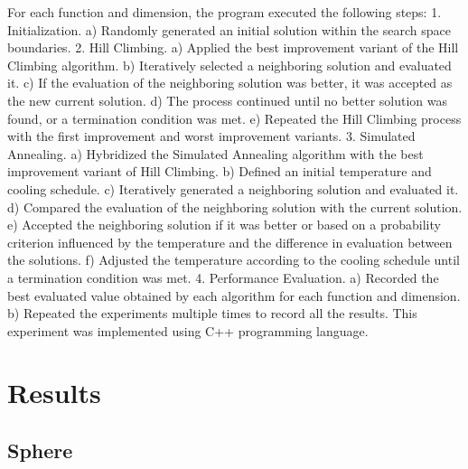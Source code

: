 \documentclass{article}
\begin{document}
For each function and dimension, the program executed the following steps:
1. Initialization.
a) Randomly generated an initial solution within the search space boundaries.
2. Hill Climbing.
a) Applied the best improvement variant of the Hill Climbing algorithm.
b) Iteratively selected a neighboring solution and evaluated it.
c) If the evaluation of the neighboring solution was better, it was accepted as the new current solution.
d) The process continued until no better solution was found, or a termination condition was met.
e) Repeated the Hill Climbing process with the first improvement and
worst improvement variants.
3. Simulated Annealing.
a) Hybridized the Simulated Annealing algorithm with the best improvement variant of Hill Climbing.
b) Defined an initial temperature and cooling schedule.
c) Iteratively generated a neighboring solution and evaluated it.
d) Compared the evaluation of the neighboring solution with the current solution.
e) Accepted the neighboring solution if it was better or based on a probability criterion influenced by the temperature and the difference in evaluation between the solutions.
f) Adjusted the temperature according to the cooling schedule until a termination condition was met.
4. Performance Evaluation.
a) Recorded the best evaluated value obtained by each algorithm for each function and dimension.
b) Repeated the experiments multiple times to record all the results.
This experiment was implemented using C++ programming language.


\newpage
\section{Results}


\subsection{Sphere}

\end{document}
